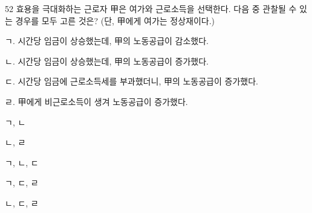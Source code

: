 \begin{question}{52}
효용을 극대화하는 근로자 甲은 여가와 근로소득을 선택한다. 다음 중 관찰될 수 있는 경우를 모두 고른 것은? (단, 甲에게 여가는 정상재이다.)
\begin{framedtext}
ㄱ. 시간당 임금이 상승했는데, 甲의 노동공급이 감소했다. \par
ㄴ. 시간당 임금이 상승했는데, 甲의 노동공급이 증가했다. \par
ㄷ. 시간당 임금에 근로소득세를 부과했더니, 甲의 노동공급이 증가했다. \par
ㄹ. 甲에게 비근로소득이 생겨 노동공급이 증가했다. \par
\end{framedtext}
\begin{choices}
  \item ㄱ, ㄴ
  \item ㄴ, ㄹ
  \item ㄱ, ㄴ, ㄷ
  \item ㄱ, ㄷ, ㄹ
  \item ㄴ, ㄷ, ㄹ
\end{choices}
\end{question}
